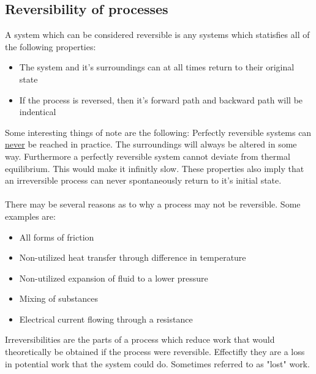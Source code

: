 \documentclass[11pt, a4paper]{article}
\begin{document}
\subsection{Reversibility of processes}
A system which can be considered reversible is any systems which statisfies all of the following properties:
\begin{itemize}
  \item The system and it's surroundings can at all times return to their original state
  \item If the process is reversed, then it's forward path and backward path will be indentical
\end{itemize}
Some interesting things of note are the following: Perfectly reversible systems can \underline{never} be reached in practice. The surroundings will always be altered in some way. Furthermore a perfectly reversible system cannot deviate from thermal equilibrium. This would make it infinitly slow. These properties also imply that an irreversible process can never spontaneously return to it's initial state.\\
\\
There may be several reasons as to why a process may not be reversible. Some examples are:
\begin{itemize}
  \item All forms of friction
  \item Non-utilized heat transfer through difference in temperature
  \item Non-utilized expansion of fluid to a lower pressure
  \item Mixing of substances
  \item Electrical current flowing through a resistance
\end{itemize}
Irreversibilities are the parts of a process which reduce work that would theoretically be obtained if the process were reversible. Effectifly they are a loss in potential work that the system could do. Sometimes referred to as "lost" work.
\end{document}
